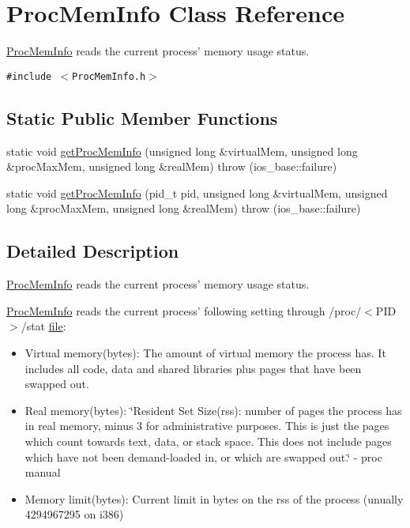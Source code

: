 \hypertarget{classProcMemInfo}{
\section{ProcMemInfo Class Reference}
\label{classProcMemInfo}
}
\hyperlink{classProcMemInfo}{ProcMemInfo} reads the current process' memory usage status.  


{\tt \#include $<$ProcMemInfo.h$>$}

\subsection*{Static Public Member Functions}
\begin{CompactItemize}
\item 
static void \hyperlink{classProcMemInfo_9c6c7f1557bcbde7e41911305b2f52ef}{getProcMemInfo} (unsigned long \&virtualMem, unsigned long \&procMaxMem, unsigned long \&realMem)  throw (ios\_\-base::failure)
\item 
static void \hyperlink{classProcMemInfo_e01508a66775485f385fbbba66241353}{getProcMemInfo} (pid\_\-t pid, unsigned long \&virtualMem, unsigned long \&procMaxMem, unsigned long \&realMem)  throw (ios\_\-base::failure)
\end{CompactItemize}


\subsection{Detailed Description}
\hyperlink{classProcMemInfo}{ProcMemInfo} reads the current process' memory usage status. 

\hyperlink{classProcMemInfo}{ProcMemInfo} reads the current process' following setting through /proc/$<$PID$>$/stat \hyperlink{classfile}{file}:\begin{itemize}
\item Virtual memory(bytes): The amount of virtual memory the process has. It includes all code, data and shared libraries plus pages that have been swapped out.\item Real memory(bytes): \char`\"{}Resident Set Size(rss): number of pages the process has in real memory, minus 3 for administrative purposes. This is just the pages which count towards text, data, or stack space. This does not include pages which have not been demand-loaded in, or which are swapped out.\char`\"{} - proc manual\item Memory limit(bytes): Current limit in bytes on the rss of the process (unually 4294967295 on i386)\end{itemize}


